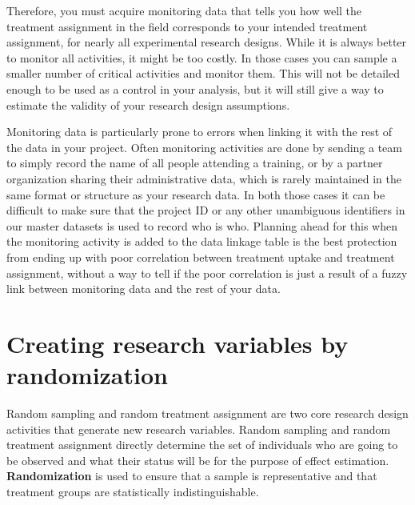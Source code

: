 Therefore, you must acquire monitoring data that
tells you how well the treatment assignment in the field
corresponds to your intended treatment assignment,
for nearly all experimental research designs.
While it is always better to monitor all activities,
it might be too costly.
In those cases you can sample a smaller number of critical activities and monitor them.
This will not be detailed enough to be used as a control in your analysis,
but it will still give a way to
estimate the validity of your research design assumptions.

Monitoring data is particularly prone to errors
when linking it with the rest of the data in your project.
Often monitoring activities are done by
sending a team to simply record the name of all people attending a training,
or by a partner organization sharing their administrative data,
which is rarely maintained in the same format or structure as your research data.
In both those cases it can be difficult to make sure that
the project ID or any other unambiguous identifiers in our master datasets
is used to record who is who.
Planning ahead for this when the monitoring activity is added to the data linkage table
is the best protection from ending up with poor correlation
between treatment uptake and treatment assignment,
without a way to tell if the poor correlation is just
a result of a fuzzy link between monitoring data and the rest of your data.

\section{Creating research variables by randomization}

Random sampling and random treatment assignment
are two core research design activities
that generate new research variables.
Random sampling and random treatment assignment directly determine
the set of individuals who are going to be observed
and what their status will be for the purpose of effect estimation.
\textbf{Randomization}
is used to ensure that a sample is representative and
that treatment groups are statistically indistinguishable.


